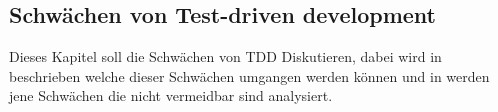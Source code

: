 \subsection{Schwächen von Test-driven development}\label{diskussion:schwaechen}

Dieses Kapitel soll die Schwächen von TDD Diskutieren, dabei wird in 
beschrieben welche dieser Schwächen umgangen werden können und in 
werden jene Schwächen die nicht vermeidbar sind analysiert.


